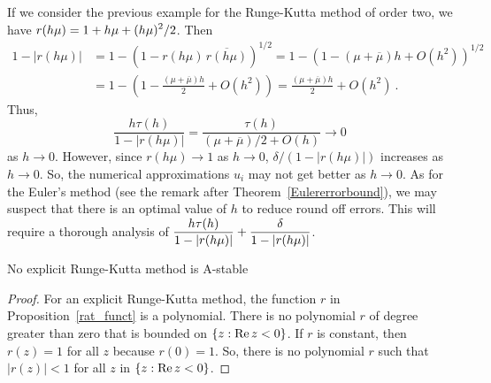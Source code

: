 \begin{rmk}
If we consider the previous example for the Runge-Kutta method of
order two, we have $\displaystyle r(h\mu) = 1 + h\mu + (h\mu)^2/2$.  Then
\begin{align*}
1 - |r(h\mu)|
&= 1 - \left( 1 - r(h\mu)\,\overline{r(h\mu)} \right)^{1/2}
= 1 - \left( 1 - (\mu + \overline{\mu})h + O(h^2)\right)^{1/2} \\
&= 1 - \left( 1 - \frac{(\mu + \overline{\mu})h}{2} + O(h^2)\right)
= \frac{(\mu + \overline{\mu})h}{2} + O(h^2) \ .
\end{align*}
Thus,
\[
\frac{h\tau(h)}{1-|r(h\mu)|}
= \frac{\tau(h)}{(\mu + \overline{\mu})/2 + O(h)} \to 0
\]
as $h\to 0$.  However, since $r(h\mu) \to 1$ as $h \to 0$, 
$\delta/(1-|r(h\mu)|)$ increases as $h\to 0$.  So, the numerical
approximations $u_i$ may not get better as $h \to 0$.  As for the
Euler's method (see the remark after Theorem~\ref{Eulererrorbound}),
we may suspect that there is an optimal value of $h$ to reduce
round off errors.  This will require a thorough analysis of
$\displaystyle \frac{h\tau(h)}{1-|r(h\mu)|} + \frac{\delta}{1-|r(h\mu)|}$.
\end{rmk}

\begin{cor}
No explicit Runge-Kutta method is A-stable
\end{cor}

\begin{proof}
For an explicit Runge-Kutta method, the function $r$ in
Proposition~\ref{rat_funct} is a polynomial.  There is no polynomial $r$ of
degree greater than zero that is bounded on
$\{ z : \operatorname{Re} z < 0 \}$.  If $r$ is constant, then
$r(z) = 1$ for all $z$ because $r(0)=1$.  So, there is no polynomial
$r$ such that $|r(z)| < 1$ for all $z$ in $\{ z : \operatorname{Re} z < 0 \}$.
\end{proof}

